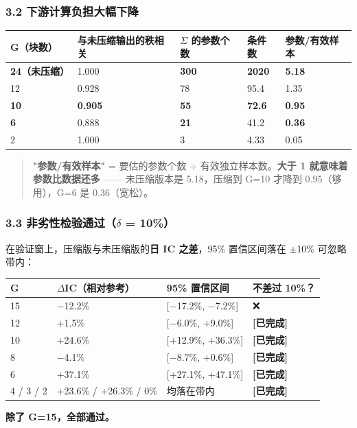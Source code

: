 \documentclass[11pt]{article}
\begin{document}
\subsubsection{\texorpdfstring{3.2 下游计算负担大幅下降}{3.2 下游计算负担大幅下降}}
{\small
\begin{longtable}{p{3.76cm}p{4.70cm}p{2.82cm}p{1.88cm}p{3.05cm}}
\toprule
G（块数） & 与未压缩输出的秩相关 & \ensuremath{\Sigma} 的参数个数 & 条件数 & 参数/有效样本 \\
\midrule
\textbf{24（未压缩）} & 1.000 & \textbf{300} & \textbf{2020} & \textbf{5.18} \\
12 & 0.928 & 78 & 95.4 & 1.35 \\
\textbf{10} & \textbf{0.905} & \textbf{55} & \textbf{72.6} & \textbf{0.95} \\
\textbf{6} & 0.888 & \textbf{21} & 41.2 & \textbf{0.36} \\
2 & 1.000 & 3 & 4.33 & 0.05 \\
\bottomrule
\end{longtable}
}
\begin{quote}
\textbf{"参数/有效样本"} = 要估的参数个数 \ensuremath{\div} 有效独立样本数。\textbf{大于 1 就意味着参数比数据还多} ------ 未压缩版本是 5.18，压缩到 G=10 才降到 0.95（够用），G=6 是 0.36（宽松）。
\end{quote}
\subsubsection{\texorpdfstring{3.3 非劣性检验通过（\ensuremath{\delta} = 10\%）}{3.3 非劣性检验通过（δ = 10）}}
在验证窗上，压缩版与未压缩版的\textbf{日 IC 之差}，95\% 置信区间落在 \ensuremath{\pm}10\% 可忽略带内：
{\small
\begin{longtable}{p{2.35cm}p{5.23cm}p{4.44cm}p{4.18cm}}
\toprule
G & \ensuremath{\Delta}IC（相对参考） & 95\% 置信区间 & \textbf{不差过 10\%？} \\
\midrule
15 & \ensuremath{-}12.2\% & [\ensuremath{-}17.2\%, \ensuremath{-}7.2\%] & ❌ \\
12 & +1.5\% & [\ensuremath{-}6.0\%, +9.0\%] & \textbf{[已完成]} \\
10 & +24.6\% & [+12.9\%, +36.3\%] & \textbf{[已完成]} \\
8 & \ensuremath{-}4.1\% & [\ensuremath{-}8.7\%, +0.6\%] & \textbf{[已完成]} \\
6 & +37.1\% & [+27.1\%, +47.1\%] & \textbf{[已完成]} \\
4 / 3 / 2 & +23.6\% / +26.3\% / 0\% & 均落在带内 & \textbf{[已完成]} \\
\bottomrule
\end{longtable}
}
\textbf{除了 G=15，全部通过。}
\end{document}

